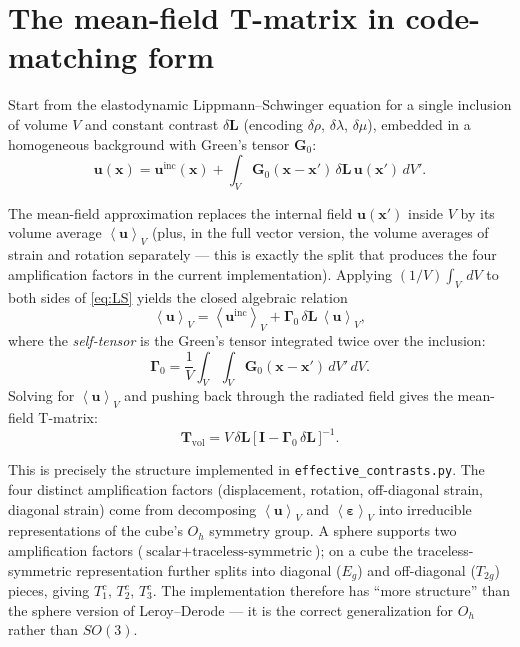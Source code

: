 \documentclass[11pt,a4paper]{article}
\newcommand{\G}{\bm{G}}
\newcommand{\T}{\bm{T}}
\newcommand{\Gam}{\bm{\Gamma}}
\newcommand{\dL}{\delta\bm{L}}
\newcommand{\uinc}{\bm{u}^{\text{inc}}}
\newcommand{\avg}[1]{\left\langle #1 \right\rangle}
\newcommand{\Oh}{O_h}
\begin{document}
\section{The mean-field T-matrix in code-matching form}

Start from the elastodynamic Lippmann--Schwinger equation for a
single inclusion of volume $V$ and constant contrast $\dL$ (encoding
$\delta\rho$, $\delta\lambda$, $\delta\mu$), embedded in a homogeneous
background with Green's tensor $\G_0$:
\begin{equation}
  \bm{u}(\bm{x}) = \uinc(\bm{x})
    + \int_V \G_0(\bm{x} - \bm{x}') \, \dL \, \bm{u}(\bm{x}') \, dV'.
  \label{eq:LS}
\end{equation}

The mean-field approximation replaces the internal field
$\bm{u}(\bm{x}')$ inside $V$ by its volume average $\avg{\bm{u}}_V$
(plus, in the full vector version, the volume averages of strain and
rotation separately --- this is exactly the split that produces the
four amplification factors in the current implementation). Applying
$(1/V)\int_V \,dV$ to both sides of \cref{eq:LS} yields the closed
algebraic relation
\begin{equation}
  \avg{\bm{u}}_V = \avg{\uinc}_V + \Gam_0 \, \dL \, \avg{\bm{u}}_V,
\end{equation}
where the \emph{self-tensor} is the Green's tensor integrated twice
over the inclusion:
\begin{equation}
  \Gam_0 = \frac{1}{V} \int_V \int_V \G_0(\bm{x} - \bm{x}') \, dV' \, dV.
  \label{eq:Gamma0}
\end{equation}
Solving for $\avg{\bm{u}}_V$ and pushing back through the radiated
field gives the mean-field T-matrix:
\begin{equation}
  \boxed{
    \T_{\text{vol}}
    = V \, \dL \, \big[\, \bm{I} - \Gam_0 \, \dL \,\big]^{-1}.
  }
  \label{eq:Tvol}
\end{equation}

This is precisely the structure implemented in
\texttt{effective\_contrasts.py}. The four distinct amplification
factors (displacement, rotation, off-diagonal strain, diagonal strain)
come from decomposing $\avg{\bm{u}}_V$ and $\avg{\bm{\varepsilon}}_V$
into irreducible representations of the cube's $\Oh$ symmetry group.
A sphere supports two amplification factors
($\text{scalar} + \text{traceless-symmetric}$); on a cube the
traceless-symmetric representation further splits into diagonal
($E_g$) and off-diagonal ($T_{2g}$) pieces, giving
$T_1^c,\, T_2^c,\, T_3^c$. The implementation therefore has ``more
structure'' than the sphere version of Leroy--Derode --- it is the
correct generalization for $\Oh$ rather than $SO(3)$.
\end{document}
